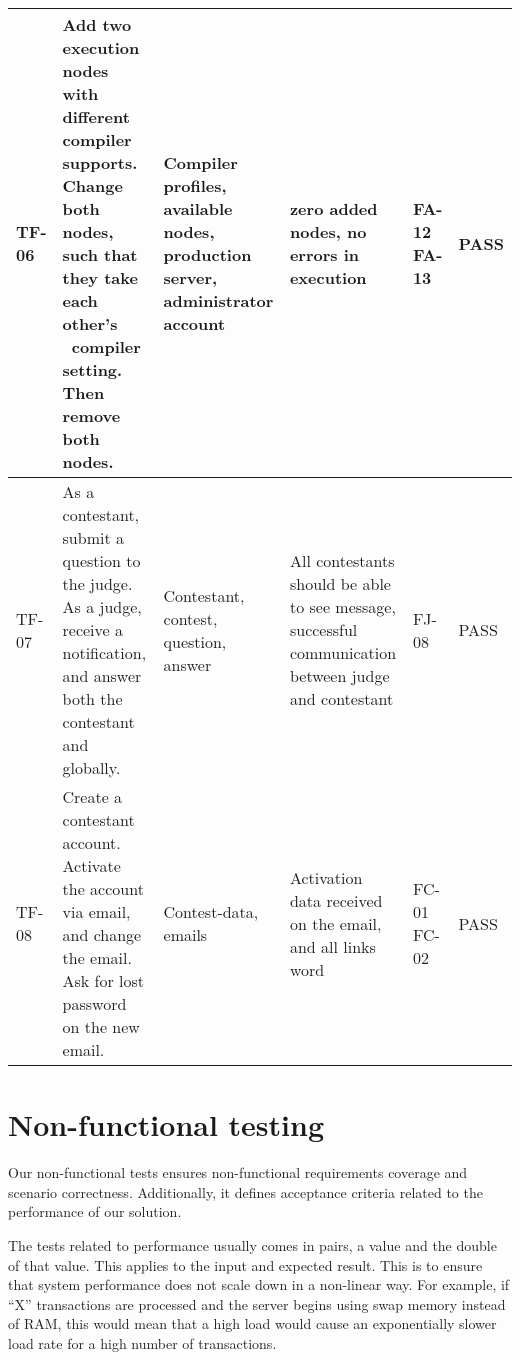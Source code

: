 \begin{longtable}{|l|p{3cm}|p{3cm}|p{3cm}|p{1.1cm}|l|}
TF-06 & Add two execution nodes with different compiler supports. Change both
nodes, such that they take each other's \ compiler setting. Then remove both
nodes. &
Compiler profiles, available nodes, production server, administrator account &
zero added nodes, no errors in execution & FA-12 FA-13 & PASS\\
\hline 

TF-07 & As a contestant, submit a question to the judge. As a judge, receive a
notification, and answer both the contestant and globally. &
Contestant, contest, question, answer &
All contestants should be able to see message, successful communication between
judge and contestant & FJ-08 & PASS\\
\hline

TF-08 & Create a contestant account. Activate the account via email, and change
the email. Ask for lost password on the new  email. &
Contest-data, emails & Activation data received on the email, and all links
word & FC-01 FC-02 & PASS\\
\hline
\end{longtable}


\section{Non-functional testing}
Our non-functional tests ensures non-functional requirements coverage and
scenario correctness. Additionally, it defines acceptance criteria related to
the performance of our solution.

The tests related to performance usually comes in pairs, a value and the double
of that value. This applies to the input and expected result.  This is to
ensure that system performance does not scale down in a non-linear way. For
example, if ``X'' transactions are processed and the server begins using swap
memory instead of RAM, this would mean that a high load would cause an
exponentially slower load rate for a high number of transactions.


